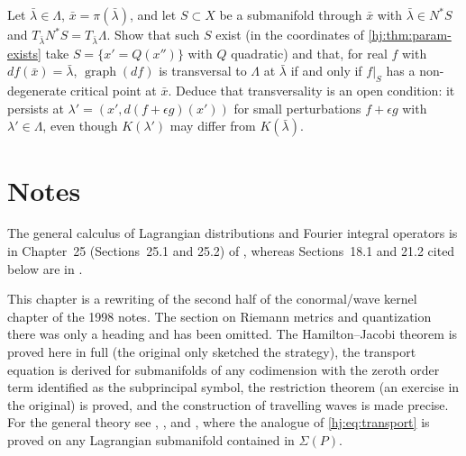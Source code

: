\begin{exercise}\label{hj:ex:testing-invariant}
  Let $\bar\lambda\in\Lambda$, $\bar x=\pi(\bar\lambda)$, and let $S\subset X$ be a
  submanifold through $\bar x$ with $\bar\lambda\in N^*S$ and
  $T_{\bar\lambda}N^*S=T_{\bar\lambda}\Lambda$.  Show that such $S$ exist (in the
  coordinates of \cref{hj:thm:param-exists} take $S=\{x'=Q(x'')\}$ with $Q$
  quadratic) and that, for real $f$ with $df(\bar x)=\bar\lambda$,
  $\operatorname{graph}(df)$ is transversal to $\Lambda$ at $\bar\lambda$ if and
  only if $f|_S$ has a non-degenerate critical point at $\bar x$.  Deduce that
  transversality is an open condition: it persists at $\lambda'=(x',d(f+\epsilon
  g)(x'))$ for small perturbations $f+\epsilon g$ with $\lambda'\in\Lambda$, even though
  $K(\lambda')$ may differ from $K(\bar\lambda)$.
\end{exercise}

\section*{Notes}
The general calculus of Lagrangian distributions and Fourier integral operators is in
Chapter~25 (Sections~25.1 and 25.2) of \cite{Hormander-IV}, whereas Sections~18.1 and
21.2 cited below are in \cite{Hormander-III}.

This chapter is a rewriting of the second half of the conormal/wave kernel
chapter of the 1998 notes.  The section on Riemann metrics and quantization
there was only a heading and has been omitted.  The Hamilton--Jacobi theorem is
proved here in full (the original only sketched the strategy), the transport
equation is derived for submanifolds of any codimension with the zeroth order
term identified as the subprincipal symbol, the restriction theorem (an exercise
in the original) is proved, and the construction of travelling waves is made
precise.  For the general theory see \cite[Section~18.1]{Hormander-III},
\cite[Section~25.2]{Hormander-IV}, and \cite{Hormander-FIO}, where the analogue of \eqref{hj:eq:transport} is
proved on any Lagrangian submanifold contained in $\Sigma(P)$.

